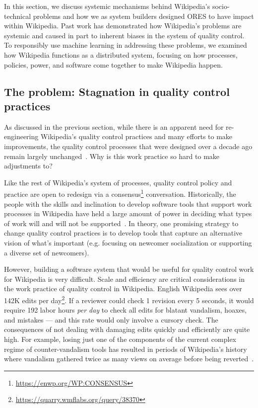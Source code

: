 In this section, we discuss systemic mechanisms behind Wikipedia's socio-technical problems and how we as system builders designed ORES to have impact within Wikipedia.  Past work has demonstrated how Wikipedia's problems are systemic and caused in part to inherent biases in the system of quality control. To responsibly use machine learning in addressing these problems, we examined how Wikipedia functions as a distributed system, focusing on how processes, policies, power, and software come together to make Wikipedia happen.

\subsection{The problem: Stagnation in quality control practices}
As discussed in the previous section, while there is an apparent need for re-engineering Wikipedia's quality control practices and many efforts to make improvements, the quality control processes that were designed over a decade ago remain largely unchanged~\cite{halfaker2014snuggle}.  Why is this work practice so hard to make adjustments to?

Like the rest of Wikipedia's system of processes, quality control policy and practice are open to redesign via a consensus\footnote{\url{https://enwp.org/WP:CONSENSUS}} conversation.  Historically, the people with the skills and inclination to develop software tools that support work processes in Wikipedia have held a large amount of power in deciding what types of work will and will not be supported~\cite{niederer2010wisdom,geiger2011lives,muller2013work,tkacz2014wikipedia,livingstone2016population}.  In theory, one promising strategy to change quality control practices is to develop tools that capture an alternative vision of what's important (e.g. focusing on newcomer socialization or supporting a diverse set of newcomers).  

However, building a software system that would be useful for quality control work for Wikipedia is very difficult.  Scale and efficiency are critical considerations in the work practice of quality control in Wikipedia.  English Wikipedia sees over 142K edits per day\footnote{\url{https://quarry.wmflabs.org/query/38370}}.  If a reviewer could check 1 revision every 5 seconds, it would require 192 labor hours \emph{per day} to check all edits for blatant vandalism, hoaxes, and mistakes --- and this rate would only involve a cursory check.  The consequences of not dealing with damaging edits quickly and efficiently are quite high.  For example, losing just one of the components of the current complex regime of counter-vandalism tools has resulted in periods of Wikipedia's history where vandalism gathered twice as many views on average before being reverted~\cite{geiger2013levee}.

